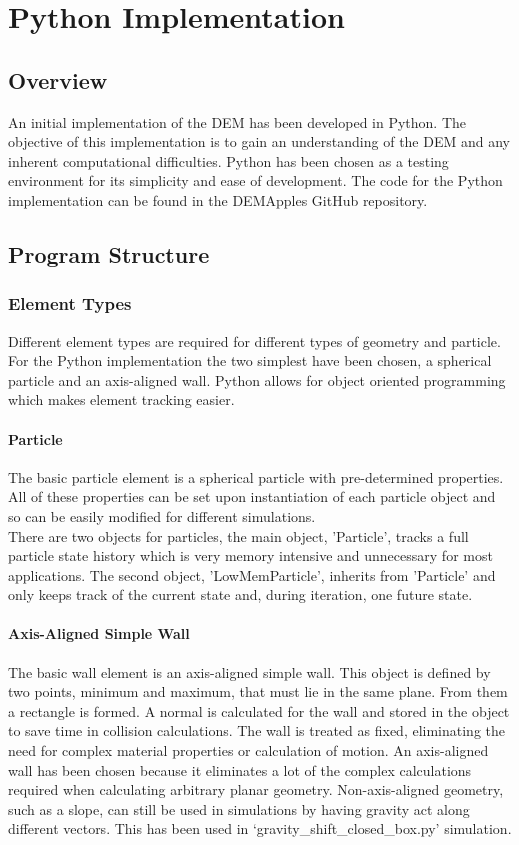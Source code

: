\documentclass[a4paper,11pt,titlepage]{report}
\begin{document}
\chapter{Python Implementation}
\label{ch:Python Implementation}
\section{Overview}
An initial implementation of the DEM has been developed in Python. The objective of this implementation is to gain an understanding of the DEM and any inherent computational difficulties. Python has been chosen as a testing environment for its simplicity and ease of development. The code for the Python implementation can be found in the DEMApples GitHub repository\cite{DEMApples}.
\section{Program Structure}
\subsection{Element Types}
Different element types are required for different types of geometry and particle. For the Python implementation the two simplest have been chosen, a spherical particle and an axis-aligned wall. Python allows for object oriented programming which makes element tracking easier.
\subsubsection{Particle}
The basic particle element is a spherical particle with pre-determined properties. All of these properties can be set upon instantiation of each particle object and so can be easily modified for different simulations.
\\There are two objects for particles, the main object, 'Particle', tracks a full particle state history which is very memory intensive and unnecessary for most applications. The second object, 'LowMemParticle', inherits from 'Particle' and only keeps track of the current state and, during iteration, one future state.
\subsubsection{Axis-Aligned Simple Wall}
The basic wall element is an axis-aligned simple wall. This object is defined by two points, minimum and maximum, that must lie in the same plane. From them a rectangle is formed. A normal is calculated for the wall and stored in the object to save time in collision calculations. The wall is treated as fixed, eliminating the need for complex material properties or calculation of motion. An axis-aligned wall has been chosen because it eliminates a lot of the complex calculations required when calculating arbitrary planar geometry. Non-axis-aligned geometry, such as a slope, can still be used in simulations by having gravity act along different vectors. This has been used in `gravity\_shift\_closed\_box.py' simulation\cite{DEMApples}.
\end{document}

